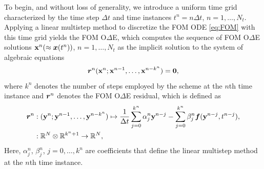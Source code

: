 \documentclass[3p,computermodern,10pt]{elsarticle}
\begin{document}
To begin, and without loss of generality, we introduce a uniform time
grid characterized by the time step $\Delta t$ and time instances
$t^n = n\Delta
t$, $n=1,\ldots,N_t$.
Applying a linear multistep method to discretize the FOM ODE \eqref{eq:FOM}
with this time grid
yields the FOM O$\Delta$E, which computes the sequence of FOM O$\Delta$E
solutions
${\mathbf{x}}^{n}( \approx {\boldsymbol x}(t^n))$, $n=1,\ldots,N_t$
as the implicit solution to the system of algebraic equations
\begin{equation}\label{eq:lms}
\boldsymbol r_{}^{n} ({\mathbf{x}}^{n};{\mathbf{x}}^{n-1},\ldots,{\mathbf{x}}^{n-k^n}) = \boldsymbol 0, 
\end{equation}
where  $k^n$ denotes the number of steps employed by the scheme at the $n$th
time instance and 
$\boldsymbol r_{}^{n}$ denotes the FOM O$\Delta$E residual, which is defined as
\begin{align*}
\boldsymbol r_{}^{n} &: (\mathbf{y}^{n};\mathbf{y}^{n-1},\ldots,\mathbf{y}^{n-k^n}) \mapsto  \frac{1}{\Delta t} \sum_{j=0}^{k^n} \alpha^n_j \mathbf{y}^{n-j} -  \sum_{j=0}^{k^n} \beta^n_j \boldsymbol f(\mathbf{y}^{n-j},t^{n-j}),
\\
&: \mathbb{R}^{N} \otimes \mathbb{R}^{k^n + 1} \rightarrow \mathbb{R}^{N},
\end{align*} 
Here, $\alpha^n_j$, $\beta^n_j$, $j=0,\ldots,k^n$ are coefficients
that define the linear multistep method at the $n$th time instance.
\end{document}
